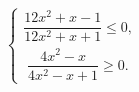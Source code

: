 \begin{ex}[type=ineq_system]
	\begin{condition}
		$\begin{cases}  \dfrac{12x^2 +x - 1}{12x^2 + x + 1}\leqslant0 ,\\
			\; \dfrac{4x^2 - x}{4x^2 - x +1}\geqslant0  .
		\end{cases}$
	\end{condition}
\end{ex}